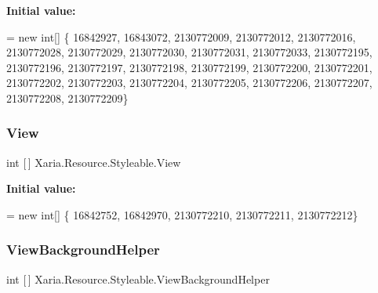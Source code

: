 {\bfseries Initial value\+:}
\begin{DoxyCode}
= \textcolor{keyword}{new} \textcolor{keywordtype}{int}[] \{
                    16842927,
                    16843072,
                    2130772009,
                    2130772012,
                    2130772016,
                    2130772028,
                    2130772029,
                    2130772030,
                    2130772031,
                    2130772033,
                    2130772195,
                    2130772196,
                    2130772197,
                    2130772198,
                    2130772199,
                    2130772200,
                    2130772201,
                    2130772202,
                    2130772203,
                    2130772204,
                    2130772205,
                    2130772206,
                    2130772207,
                    2130772208,
                    2130772209\}
\end{DoxyCode}
\mbox{\label{classXaria_1_1Resource_1_1Styleable_a3877453c843711e7271e3322a32dfcc1}} 
\subsubsection{\texorpdfstring{View}{View}}
{\footnotesize\ttfamily int \mbox{[}$\,$\mbox{]} Xaria.\+Resource.\+Styleable.\+View\hspace{0.3cm}{\ttfamily [static]}}

{\bfseries Initial value\+:}
\begin{DoxyCode}
= \textcolor{keyword}{new} \textcolor{keywordtype}{int}[] \{
                    16842752,
                    16842970,
                    2130772210,
                    2130772211,
                    2130772212\}
\end{DoxyCode}
\mbox{\label{classXaria_1_1Resource_1_1Styleable_abdd791f9ea155fc1580328a12b4e01eb}} 
\subsubsection{\texorpdfstring{View\+Background\+Helper}{ViewBackgroundHelper}}
{\footnotesize\ttfamily int \mbox{[}$\,$\mbox{]} Xaria.\+Resource.\+Styleable.\+View\+Background\+Helper\hspace{0.3cm}{\ttfamily [static]}}

